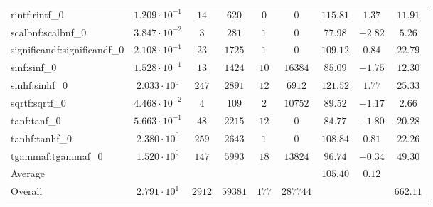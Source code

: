 \begin{tabular}{|l|c|c|c|c|c|c|c|c|}
rintf:rintf\_0               & $ 1.209 \cdot 10^{-1} $ & $ 14     $ & $ 620   $ & $ 0   $ & $ 0      $ & $ 115.81      $ & $ 1.37    $ & $ 11.91   $ \\
scalbnf:scalbnf\_0           & $ 3.847 \cdot 10^{-2} $ & $ 3      $ & $ 281   $ & $ 1   $ & $ 0      $ & $ 77.98       $ & $ -2.82   $ & $ 5.26    $ \\
significandf:significandf\_0 & $ 2.108 \cdot 10^{-1} $ & $ 23     $ & $ 1725  $ & $ 1   $ & $ 0      $ & $ 109.12      $ & $ 0.84    $ & $ 22.79   $ \\
sinf:sinf\_0                 & $ 1.528 \cdot 10^{-1} $ & $ 13     $ & $ 1424  $ & $ 10  $ & $ 16384  $ & $ 85.09       $ & $ -1.75   $ & $ 12.30   $ \\
sinhf:sinhf\_0               & $ 2.033 \cdot 10^{0}  $ & $ 247    $ & $ 2891  $ & $ 12  $ & $ 6912   $ & $ 121.52      $ & $ 1.77    $ & $ 25.33   $ \\
sqrtf:sqrtf\_0               & $ 4.468 \cdot 10^{-2} $ & $ 4      $ & $ 109   $ & $ 2   $ & $ 10752  $ & $ 89.52       $ & $ -1.17   $ & $ 2.66    $ \\
tanf:tanf\_0                 & $ 5.663 \cdot 10^{-1} $ & $ 48     $ & $ 2215  $ & $ 12  $ & $ 0      $ & $ 84.77       $ & $ -1.80   $ & $ 20.28   $ \\
tanhf:tanhf\_0               & $ 2.380 \cdot 10^{0}  $ & $ 259    $ & $ 2643  $ & $ 1   $ & $ 0      $ & $ 108.84      $ & $ 0.81    $ & $ 22.26   $ \\
tgammaf:tgammaf\_0           & $ 1.520 \cdot 10^{0}  $ & $ 147    $ & $ 5993  $ & $ 18  $ & $ 13824  $ & $ 96.74       $ & $ -0.34   $ & $ 49.30   $ \\
\hline
Average                      & $                     $ & $        $ & $       $ & $     $ & $        $ & $ 105.40      $ & $ 0.12    $ & $         $ \\
\hline
Overall                      & $ 2.791 \cdot 10^{1}  $ & $ 2912   $ & $ 59381 $ & $ 177 $ & $ 287744 $ & $             $ & $         $ & $ 662.11  $ \\
\hline
\end{tabular}
